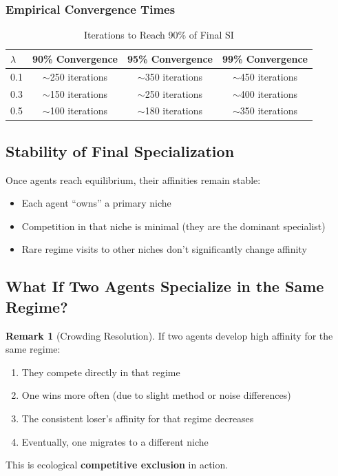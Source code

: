 \documentclass[11pt,a4paper]{article}
\theoremstyle{definition}
\newtheorem{remark}{Remark}[section]
\theoremstyle{plain}
\begin{document}
\subsubsection{Empirical Convergence Times}

\begin{table}[h]
\centering
\caption{Iterations to Reach 90\% of Final SI}
\begin{tabular}{l|ccc}
\toprule
$\lambda$ & 90\% Convergence & 95\% Convergence & 99\% Convergence \\
\midrule
0.1 & $\sim$250 iterations & $\sim$350 iterations & $\sim$450 iterations \\
0.3 & $\sim$150 iterations & $\sim$250 iterations & $\sim$400 iterations \\
0.5 & $\sim$100 iterations & $\sim$180 iterations & $\sim$350 iterations \\
\bottomrule
\end{tabular}
\end{table}

\subsection{Stability of Final Specialization}

Once agents reach equilibrium, their affinities remain stable:

\begin{itemize}
    \item Each agent ``owns'' a primary niche
    \item Competition in that niche is minimal (they are the dominant specialist)
    \item Rare regime visits to other niches don't significantly change affinity
\end{itemize}

\subsection{What If Two Agents Specialize in the Same Regime?}

\begin{remark}[Crowding Resolution]
If two agents develop high affinity for the same regime:
\begin{enumerate}
    \item They compete directly in that regime
    \item One wins more often (due to slight method or noise differences)
    \item The consistent loser's affinity for that regime decreases
    \item Eventually, one migrates to a different niche
\end{enumerate}
This is ecological \textbf{competitive exclusion} in action.
\end{remark}
\end{document}
